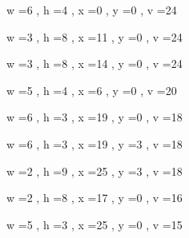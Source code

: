 \documentclass[11pt]{article}
\begin{document}
w =6 , h =4 , x =0 , y =0 , v =24
\par
w =3 , h =8 , x =11 , y =0 , v =24
\par
w =3 , h =8 , x =14 , y =0 , v =24
\par
w =5 , h =4 , x =6 , y =0 , v =20
\par
w =6 , h =3 , x =19 , y =0 , v =18
\par
w =6 , h =3 , x =19 , y =3 , v =18
\par
w =2 , h =9 , x =25 , y =3 , v =18
\par
w =2 , h =8 , x =17 , y =0 , v =16
\par
w =5 , h =3 , x =25 , y =0 , v =15
\par
\newpage
\end{document}
